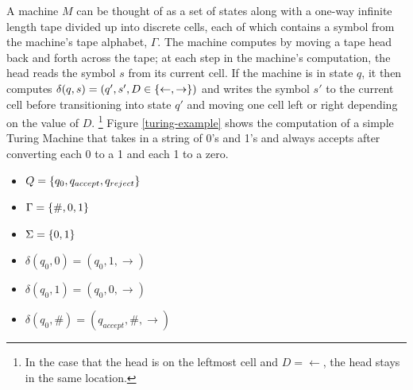 \documentclass{article}
\newcommand{\blank}{\#}
\begin{document}
A machine $M$ can be thought of as a set of states along with a
one-way infinite length tape divided up into discrete cells, each of
which contains a symbol from the machine's tape alphabet, $\Gamma$.
The machine computes by moving a tape head back and forth across the
tape; at each step in the machine's computation, the head reads the
symbol $s$ from its current cell.  If the machine is in state $q$, it
then computes $\delta(q, s) = (q', s', D \in \{\leftarrow,
  \rightarrow\})$ and writes the symbol $s'$ to the current cell before
transitioning into state $q'$ and moving one cell left or right
depending on the value of $D$. \footnote[2]{In the case that the head
  is on the leftmost cell and $D = \leftarrow$, the head stays in the
  same location.}  Figure \ref{turing-example} shows the computation of a
simple Turing Machine that takes in a string of 0's and 1's and always
accepts after converting each 0 to a 1 and each 1 to a zero.

\begin{itemize}
\item $Q = \{q_0, q_{accept}, q_{reject}\}$
\item $\Gamma = \set{\blank, 0, 1}$
\item $\Sigma = \{0,1\}$
\item $\delta(q_0, 0) = (q_0, 1, \rightarrow)$
\item $\delta(q_0, 1) = (q_0, 0, \rightarrow)$
\item $\delta(q_0, \blank) = (q_{accept}, \blank, \rightarrow)$
\end{itemize}
\end{document}

